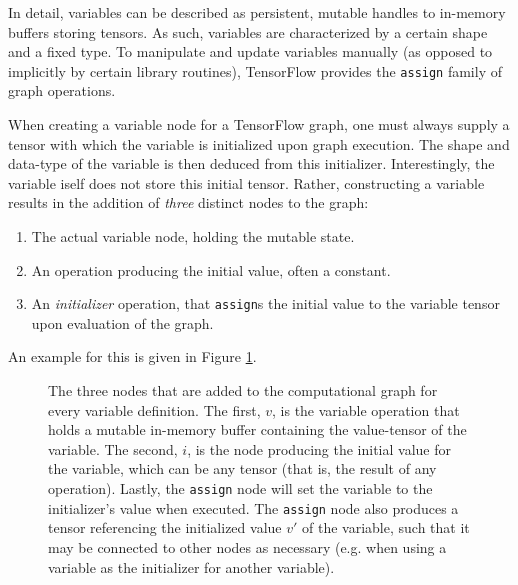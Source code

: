 In detail, variables can be described as persistent, mutable handles to
in-memory buffers storing tensors. As such, variables are characterized by a
certain shape and a fixed type. To manipulate and update variables manually (as
opposed to implicitly by certain library routines), TensorFlow provides the
\texttt{assign} family of graph operations.

When creating a variable node for a TensorFlow graph, one must always supply a
tensor with which the variable is initialized upon graph execution. The shape
and data-type of the variable is then deduced from this
initializer. Interestingly, the variable iself does not store this initial
tensor. Rather, constructing a variable results in the addition of \emph{three}
distinct nodes to the graph:

\begin{enumerate}
  \item The actual variable node, holding the mutable state.
  \item An operation producing the initial value, often a constant.
  \item An \emph{initializer} operation, that \texttt{assign}s the initial value
    to the variable tensor upon evaluation of the graph.
\end{enumerate}

An example for this is given in Figure \ref{fig:variable}.

\begin{figure}
  \centering
  \label{fig:variable}
  \caption{The three nodes that are added to the computational graph for every
    variable definition. The first, $v$, is the variable operation that holds a
    mutable in-memory buffer containing the value-tensor of the variable. The
    second, $i$, is the node producing the initial value for the variable, which
    can be any tensor (that is, the result of any operation). Lastly, the
    \texttt{assign} node will set the variable to the initializer's value when
    executed. The \texttt{assign} node also produces a tensor referencing the
    initialized value $v'$ of the variable, such that it may be connected to
    other nodes as necessary (e.g. when using a variable as the initializer for
    another variable). }
\end{figure}


